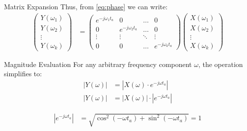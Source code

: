 \documentclass{beamer}
\theoremstyle{remark}
\providecommand{\abs}[1]{\left\vert#1\right\vert}
\numberwithin{equation}{section}
\begin{document}
\begin{frame}{Matrix Expansion}
Thus, from \eqref{eq:phase} we can write:
\begin{align}
    \begin{pmatrix} Y(\omega_1) \\ Y(\omega_2) \\ \vdots \\ Y(\omega_k) \end{pmatrix} 
    &=
    \begin{pmatrix}
    e^{-j\omega_1 t_a} & 0 & \dots & 0 \\
    0 & e^{-j\omega_2 t_a} & \dots & 0 \\
    \vdots & \vdots & \ddots & \vdots \\
    0 & 0 & \dots & e^{-j\omega_k t_a}
    \end{pmatrix}
    \begin{pmatrix} X(\omega_1) \\ 
X(\omega_2) \\ \vdots \\ X(\omega_k) \end{pmatrix}
\end{align}
\end{frame}

\begin{frame}{Magnitude Evaluation}
For any arbitrary frequency component $\omega$, the operation simplifies to:
\begin{align}
  \label{eq:ans}
    \abs{Y(\omega)} &= \abs{X(\omega) \cdot e^{-j\omega t_a}} \\
    \abs{Y(\omega)} &= \abs{X(\omega)} \cdot \abs{e^{-j\omega t_a}} \label{eq:magnitude_split}
\end{align}

\begin{align}
    \abs{e^{-j\omega t_a}} &= \sqrt{\cos^2(-\omega t_a) + \sin^2(-\omega t_a)} = 1
\end{align}
\end{frame}
\end{document}
